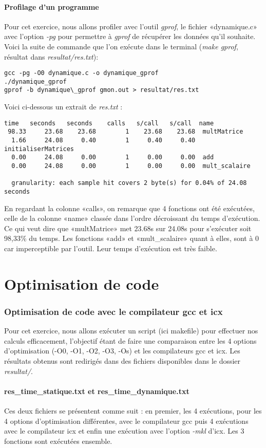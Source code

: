 \documentclass{rapport}
\begin{document}
\subsection{Profilage d'un programme}
Pour cet exercice, nous allons profiler avec l'outil \textit{gprof}, le fichier «dynamique.c» avec l'option \textit{-pg} pour permettre à \textit{gprof} de récupérer les données qu'il souhaite. Voici la suite de commande que l'on exécute dans le terminal (\textit{make gprof}, résultat dans \textit{resultat/res.txt}): 
 \begin{lstlisting}
gcc -pg -O0 dynamique.c -o dynamique_gprof
./dynamique_gprof
gprof -b dynamique\_gprof gmon.out > resultat/res.txt
  \end{lstlisting} 
  Voici ci-dessous un extrait de \textit{res.txt} :
  \begin{lstlisting}
time   seconds   seconds    calls   s/call   s/call  name    
 98.33     23.68    23.68        1    23.68    23.68  multMatrice
  1.66     24.08     0.40        1     0.40     0.40  initialiserMatrices
  0.00     24.08     0.00        1     0.00     0.00  add
  0.00     24.08     0.00        1     0.00     0.00  mult_scalaire

  granularity: each sample hit covers 2 byte(s) for 0.04% of 24.08 seconds
  \end{lstlisting} 
En regardant la colonne «calls», on remarque que 4 fonctions ont été exécutées, celle de la colonne «name» classée dans l'ordre décroissant du temps d'exécution. Ce qui veut dire que «multMatrice» met 23.68s sur 24.08s pour s'exécuter soit 98,33\% du temps.
Les fonctions «add» et «mult\_scalaire» quant à elles, sont à 0 car imperceptible par l'outil. Leur temps d'exécution est très faible.
\clearpage
    \part{Optimisation de code}\setcounter{section}{0}
    \section{Optimisation de code avec le compilateur gcc et icx}
Pour cet exercice, nous allons exécuter un script (ici makefile) pour effectuer nos calculs efficacement, l'objectif étant de faire une comparaison entre les 4 options d'optimisation (-O0, -O1, -O2, -O3, -Os) et les compilateurs gcc et icx. Les résultats obtenus sont redirigés dans des fichiers disponibles dans le dossier \textit{resultat/}.
\subsection{res\_time\_statique.txt et res\_time\_dynamique.txt}
\label{sec:mkl}
Ces deux fichiers se présentent comme suit : en premier, les 4 exécutions, pour les 4 options d'optimisation différentes, avec le compilateur gcc puis 4 exécutions avec le compilateur icx et enfin une exécution avec l'option \textit{-mkl} d'icx. Les 3 fonctions sont exécutées ensemble.
\end{document}
